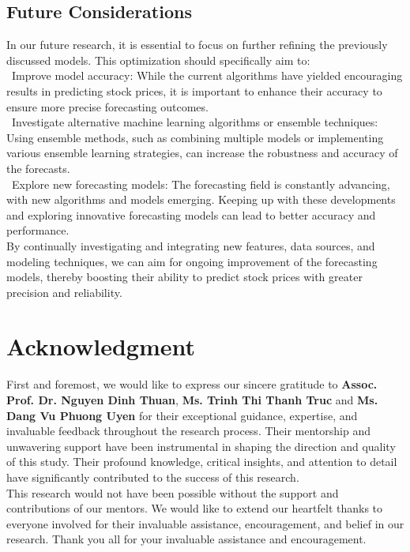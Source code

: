 \documentclass{ieeeojies}
\begin{document}
\subsection{Future Considerations}
In our future research, it is essential to focus on further refining the previously discussed models. This optimization should specifically aim to:\\
\indent\textbullet\ Improve model accuracy: While the current algorithms have yielded encouraging results in predicting stock prices, it is important to enhance their accuracy to ensure more precise forecasting outcomes.\\
\indent\textbullet\ Investigate alternative machine learning algorithms or ensemble techniques: Using ensemble methods, such as combining multiple models or implementing various ensemble learning strategies, can increase the robustness and accuracy of the forecasts.\\
\indent\textbullet\ Explore new forecasting models: The forecasting field is constantly advancing, with new algorithms and models emerging. Keeping up with these developments and exploring innovative forecasting models can lead to better accuracy and performance.\\
By continually investigating and integrating new features, data sources, and modeling techniques, we can aim for ongoing improvement of the forecasting models, thereby boosting their ability to predict stock prices with greater precision and reliability.

\section*{Acknowledgment}
First and foremost, we would like to express our sincere gratitude to \textbf{Assoc. Prof. Dr. Nguyen Dinh Thuan}, \textbf{Ms. Trinh Thi Thanh Truc} and \textbf{Ms. Dang Vu Phuong Uyen} for their exceptional guidance, expertise, and invaluable feedback throughout the research process. Their mentorship and unwavering support have been instrumental in shaping the direction and quality of this study. Their profound knowledge, critical insights, and attention to detail have significantly contributed to the success of this research.
\\This research would not have been possible without the support and contributions of our mentors. We would like to extend our heartfelt thanks to everyone involved for their invaluable assistance, encouragement, and belief in our research. Thank you all for your invaluable assistance and encouragement.
\end{document}
